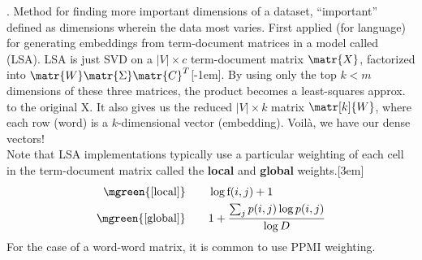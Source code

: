 \documentclass[11pt]{article}
\newcommand\myspace[1][]{\vspace{#1\bigskipamount}}
\newcommand\p{\Needspace{10\baselineskip} \noindent}
\begin{document}
\myspace
\p {}. Method for finding more important dimensions of a dataset, ``important'' defined as dimensions wherein the data most varies. First applied (for language) for generating embeddings from term-document matrices in a model called  (LSA). LSA is just SVD on a $|V| \times c$ term-document matrix $\matr{X}$, factorized into $\matr{W}\matr{\Sigma}\matr{C}^T$[-1em]. By using only the top $k < m$ dimensions of these three matrices, the product becomes a least-squares approx. to the original X. It also gives us the reduced $|V| \times k$ matrix $\matr[k]{W}$, where each row (word) is a $k$-dimensional vector (embedding). Voilà, we have our dense vectors!\\

\p Note that LSA implementations typically use a particular weighting of each cell in the term-document matrix called the \textbf{local} and \textbf{global} weights.[3em]
\begin{align}
\mgreen{\text{[local]}} \qquad &\log \text f(i, j) + 1 \\
\mgreen{\text{[global]}} \qquad &1 + \frac{   
		\sum_j p(i, j) \log p(i, j)
	}{  
		\log D
	}
\end{align}
For the case of a word-word matrix, it is common to use PPMI weighting.
\end{document}
